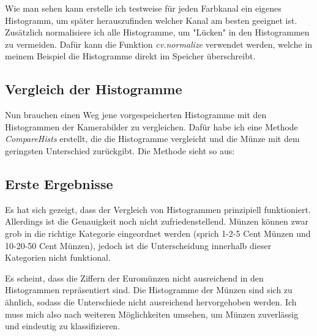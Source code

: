 Wie man sehen kann erstelle ich testweise für jeden Farbkanal ein eigenes Histogramm, um später herauszufinden welcher Kanal am besten geeignet ist. Zusätzlich normalisiere ich alle Histogramme, um "Lücken" in den Histogrammen zu vermeiden. Dafür kann die Funktion \textit{cv.normalize} verwendet werden, welche in meinem Beispiel die Histogramme direkt im Speicher überschreibt.

\subsection{Vergleich der Histogramme}
Nun brauchen einen Weg jene vorgespeicherten Histogramme mit den Histogrammen der Kamerabilder zu vergleichen. Dafür habe ich eine Methode \textit{CompareHists} erstellt, die die Histogramme vergleicht und die Münze mit dem geringsten Unterschied zurückgibt. Die Methode sieht so aus:

\subsection{Erste Ergebnisse}
Es hat sich gezeigt, dass der Vergleich von Histogrammen prinzipiell funktioniert. Allerdings ist die Genauigkeit noch nicht zufriedenstellend. Münzen können zwar grob in die richtige Kategorie eingeordnet werden (sprich 1-2-5 Cent Münzen und 10-20-50 Cent Münzen), jedoch ist die Unterscheidung innerhalb dieser Kategorien nicht funktional.

Es scheint, dass die Ziffern der Euromünzen nicht ausreichend in den Histogrammen repräsentiert sind. Die Histogramme der Münzen sind sich zu ähnlich, sodass die Unterschiede nicht ausreichend hervorgehoben werden. Ich muss mich also nach weiteren Möglichkeiten umsehen, um Münzen zuverlässig und eindeutig zu klassifizieren.